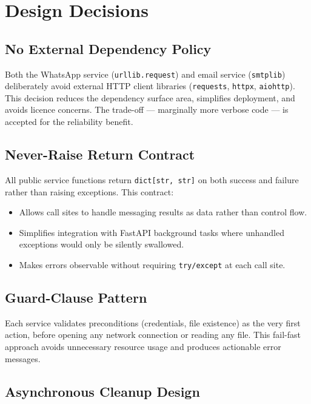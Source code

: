 \documentclass[12pt, a4paper]{article}
\begin{document}
\section{Design Decisions}

\subsection{No External Dependency Policy}

Both the WhatsApp service (\texttt{urllib.request}) and email service
(\texttt{smtplib}) deliberately avoid external HTTP client libraries
(\texttt{requests}, \texttt{httpx}, \texttt{aiohttp}).
This decision reduces the dependency surface area, simplifies deployment,
and avoids licence concerns. The trade-off — marginally more verbose code —
is accepted for the reliability benefit.

\subsection{Never-Raise Return Contract}

All public service functions return \texttt{dict[str, str]} on both success
and failure rather than raising exceptions. This contract:

\begin{itemize}[leftmargin=*]
  \item Allows call sites to handle messaging results as data rather
        than control flow.
  \item Simplifies integration with FastAPI background tasks where
        unhandled exceptions would only be silently swallowed.
  \item Makes errors observable without requiring \texttt{try/except}
        at each call site.
\end{itemize}

\subsection{Guard-Clause Pattern}

Each service validates preconditions (credentials, file existence) as the
very first action, before opening any network connection or reading any file.
This fail-fast approach avoids unnecessary resource usage and produces
actionable error messages.

\subsection{Asynchronous Cleanup Design}
\end{document}
